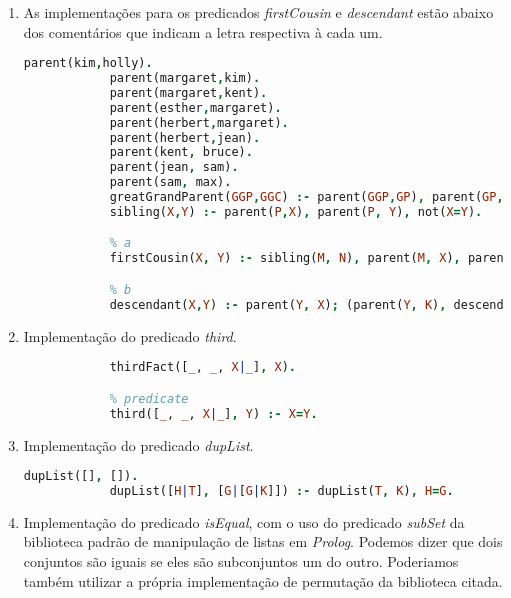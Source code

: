 \documentclass{article}
\begin{document}
\begin{enumerate}
    \item

          As implementações para os predicados \textit{firstCousin} e
          \textit{descendant} estão abaixo dos comentários
          que indicam a letra respectiva à cada um.

          \begin{lstlisting}[language=Prolog]
            parent(kim,holly).
            parent(margaret,kim).
            parent(margaret,kent).
            parent(esther,margaret).
            parent(herbert,margaret).
            parent(herbert,jean).
            parent(kent, bruce).
            parent(jean, sam).
            parent(sam, max).
            greatGrandParent(GGP,GGC) :- parent(GGP,GP), parent(GP,P), parent(P,GGC).
            sibling(X,Y) :- parent(P,X), parent(P, Y), not(X=Y).

            % a
            firstCousin(X, Y) :- sibling(M, N), parent(M, X), parent(N, Y), not(X=Y), not(sibling(X, Y)).

            % b
            descendant(X,Y) :- parent(Y, X); (parent(Y, K), descendant(X, K)).
        \end{lstlisting}

    \item

          Implementação do predicado \textit{third}.

          \begin{lstlisting}[language=Prolog]
            % fact
            thirdFact([_, _, X|_], X).

            % predicate
            third([_, _, X|_], Y) :- X=Y.
        \end{lstlisting}

    \item

          Implementação do predicado \textit{dupList}.

          \begin{lstlisting}[language=Prolog]
            dupList([], []).
            dupList([H|T], [G|[G|K]]) :- dupList(T, K), H=G.
        \end{lstlisting}

    \item

          Implementação do predicado \textit{isEqual}, com o uso do predicado
          \textit{subSet}
          da
          biblioteca padrão de manipulação
          de listas em \textit{Prolog}. Podemos dizer que dois conjuntos são
          iguais se eles são
          subconjuntos um do outro. Poderiamos também utilizar a própria
          implementação
          de permutação da biblioteca citada.


\end{enumerate}
\end{document}
